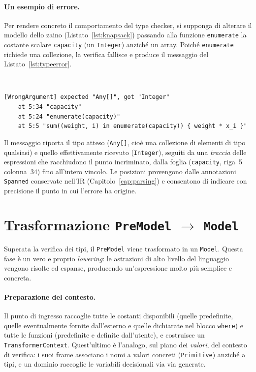 \paragraph{Un esempio di errore.}
Per rendere concreto il comportamento del type checker, si supponga di alterare il
modello dello zaino (Listato~\ref{lst:knapsack}) passando alla funzione
\texttt{enumerate} la costante scalare \texttt{capacity} (un \texttt{Integer})
anziché un array. Poiché \texttt{enumerate} richiede una collezione, la verifica
fallisce e produce il messaggio del Listato~\ref{lst:typeerror}.

\

\begin{lstlisting}[language={}, caption={Errore di tipo con la relativa traccia posizionale.}, label={lst:typeerror}]
[WrongArgument] expected "Any[]", got "Integer"
	at 5:34 "capacity"
	at 5:24 "enumerate(capacity)"
	at 5:5 "sum((weight, i) in enumerate(capacity)) { weight * x_i }"
\end{lstlisting}

Il messaggio riporta il tipo atteso (\texttt{Any[]}, cioè una collezione di
elementi di tipo qualsiasi) e quello effettivamente ricevuto (\texttt{Integer}),
seguiti da una \emph{traccia} delle espressioni che racchiudono il punto
incriminato, dalla foglia (\texttt{capacity}, riga~5 colonna~34) fino all'intero
vincolo. Le posizioni provengono dalle annotazioni \texttt{Spanned} conservate
nell'IR (Capitolo~\ref{cap:parsing}) e consentono di indicare con precisione il
punto in cui l'errore ha origine.

\section{Trasformazione \texttt{PreModel} \texorpdfstring{$\rightarrow$}{->} \texttt{Model}}
\label{sec:trasformazione-modello}

Superata la verifica dei tipi, il \texttt{PreModel} viene trasformato in un
\texttt{Model}. Questa fase è un vero e proprio \emph{lowering}: le astrazioni di
alto livello del linguaggio vengono risolte ed espanse, producendo
un'espressione molto più semplice e concreta.

\paragraph{Preparazione del contesto.}
Il punto di ingresso raccoglie tutte le costanti disponibili (quelle predefinite,
quelle eventualmente fornite dall'esterno e quelle dichiarate nel blocco
\texttt{where}) e tutte le funzioni (predefinite e definite dall'utente), e
costruisce un \texttt{TransformerContext}. Quest'ultimo è l'analogo, sul piano
dei \emph{valori}, del contesto di verifica: i suoi frame associano i nomi a
valori concreti (\texttt{Primitive}) anziché a tipi, e un dominio raccoglie le
variabili decisionali via via generate.


